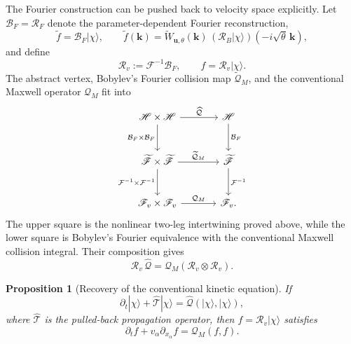 \documentclass[11pt,oneside]{article}
\numberwithin{equation}{section}
\newtheorem{proposition}[theorem]{Proposition}
\theoremstyle{definition}
\begin{document}
The Fourier construction can be pushed back to velocity space explicitly.  Let $\mathcal B_F=\mathcal R_F$ denote the parameter-dependent Fourier reconstruction,
\begin{equation}
\widetilde f
=\mathcal B_F|\chi\rangle,
\qquad
\widetilde f(\bm k)
=\widetilde W_{\bm u,\theta}(\bm k)\,
(\mathcal R_B|\chi\rangle)(-i\sqrt{\theta}\,\bm k),
\label{eq:maxwell_BF_recalled}
\end{equation}
and define
\begin{equation}
\mathcal R_v:=\mathcal F^{-1}\mathcal B_F,
\qquad f=\mathcal R_v|\chi\rangle.
\label{eq:maxwell_velocity_realization}
\end{equation}
The abstract vertex, Bobylev's Fourier collision map $\widetilde{\mathcal Q}_M$, and the conventional Maxwell operator $\mathcal Q_M$ fit into
\begin{equation}
\begin{tikzcd}[column sep=large, row sep=large]
\mathscr H\times \mathscr H
\arrow[r, "\widehat{\mathcal Q}"]
\arrow[d, "\mathcal B_F\times\mathcal B_F"']
&
\mathscr H
\arrow[d, "\mathcal B_F"]
\\
\widetilde{\mathscr F}\times \widetilde{\mathscr F}
\arrow[r, "\widetilde{\mathcal Q}_M"]
\arrow[d, "\mathcal F^{-1}\times\mathcal F^{-1}"']
&
\widetilde{\mathscr F}
\arrow[d, "\mathcal F^{-1}"]
\\
\mathscr F_v\times \mathscr F_v
\arrow[r, "\mathcal Q_M"]
&
\mathscr F_v .
\end{tikzcd}
\label{eq:maxwell_commutative_diagram}
\end{equation}
The upper square is the nonlinear two-leg intertwining proved above, while the lower square is Bobylev's Fourier equivalence with the conventional Maxwell collision integral.  Their composition gives
\begin{equation}
\mathcal R_v\,\widehat{\mathcal Q}
=\mathcal Q_M(\mathcal R_v\otimes\mathcal R_v).
\label{eq:maxwell_velocity_intertwining}
\end{equation}

\begin{proposition}[Recovery of the conventional kinetic equation]
\label{prop:maxwell_recovery_velocity}
If
\begin{equation}
\partial_t|\chi\rangle+\widehat{\mathcal T}|\chi\rangle
=\widehat{\mathcal Q}(|\chi\rangle,|\chi\rangle),
\label{eq:maxwell_abstract_fock_eq_recalled}
\end{equation}
where $\widehat{\mathcal T}$ is the pulled-back propagation operator, then $f=\mathcal R_v|\chi\rangle$ satisfies
\begin{equation}
\partial_t f+v_\alpha\partial_{x_\alpha}f=\mathcal Q_M(f,f).
\label{eq:maxwell_conventional_boltzmann_recovered}
\end{equation}
\end{proposition}
\end{document}
